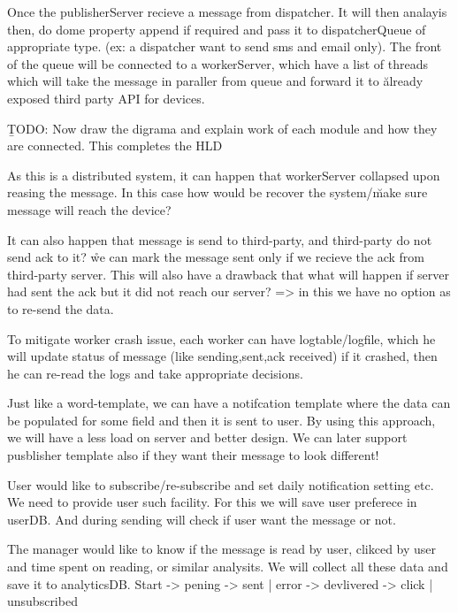 Once the publisherServer recieve a message from dispatcher. It will then analayis then, do dome property append if required and pass it to dispatcherQueue of appropriate type. (ex: a dispatcher want to send sms and email only). The front of the queue will be connected to a workerServer, which have a list of threads which will take the message in paraller from queue and forward it to \u{already exposed third party API for devices}.

\b{TODO: Now draw the digrama and explain work of each module and how they are connected. This completes the HLD}




As this is a distributed system, it can happen that workerServer collapsed upon reasing the message. In this case how would be recover the system/\u{make sure message will reach the device}?

It can also happen that message is send to third-party, and third-party do not send ack to it?
\r{we can mark the message sent only if we recieve the ack from third-party server. This will also have a drawback that what will happen if server had sent the ack but it did not reach our server? => in this we have no option as to re-send the data. }

To mitigate worker crash issue, each worker can have logtable/logfile, which he will update status of message (like sending,sent,ack received) if it crashed, then he can re-read the logs and take appropriate decisions.

Just like a word-template, we can have a notifcation template where the data can be populated for some field and then it is sent to user. By using this approach, we will have a less load on server and better design. We can later support pusblisher template also if they want their message to look different!

User would like to subscribe/re-subscribe and set daily notification setting etc. We need to provide user such facility. For this we will save user preferece in userDB. And during sending will check if user want the message or not.

The manager would like to know if the message is read by user, clikced by user and time spent on reading, or similar analysits. We will collect all these data and save it to analyticsDB.
Start -> pening -> sent | error -> devlivered -> click | unsubscribed

